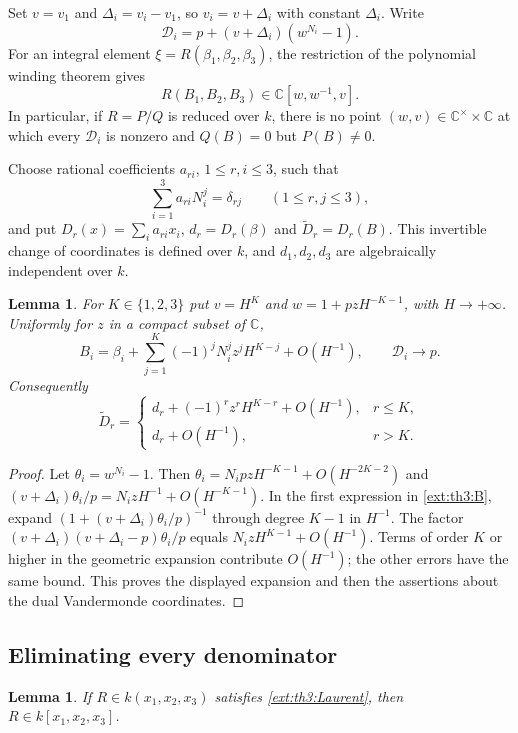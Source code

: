 \documentclass[11pt,a4paper]{article}
\newtheorem{lemma}[theorem]{Lemma}
\theoremstyle{definition}\newtheorem{definition}[theorem]{Definition}
\theoremstyle{remark}\newtheorem{remark}[theorem]{Remark}
\begin{document}
Set $v=v_1$ and $\Delta_i=v_i-v_1$, so $v_i=v+\Delta_i$ with constant
$\Delta_i$.  Write
\[
 \mathcal D_i=p+(v+\Delta_i)(w^{N_i}-1).
\]
For an integral element $\xi=R(\beta_1,\beta_2,\beta_3)$, the restriction
of the polynomial winding theorem gives
\begin{equation}\label{ext:th3:Laurent}
 R(B_1,B_2,B_3)\in\mathbb C[w,w^{-1},v].
\end{equation}
In particular, if $R=P/Q$ is reduced over $k$, there is no point
$(w,v)\in\mathbb C^\times\times\mathbb C$ at which every $\mathcal D_i$
is nonzero and $Q(B)=0$ but $P(B)\ne0$.

Choose rational coefficients $a_{ri}$, $1\le r,i\le3$, such that
\[
 \sum_{i=1}^3 a_{ri}N_i^j=\delta_{rj}\qquad(1\le r,j\le3),
\]
and put $D_r(x)=\sum_i a_{ri}x_i$, $d_r=D_r(\beta)$ and
$\widetilde D_r=D_r(B)$.  This invertible change of coordinates is defined
over $k$, and $d_1,d_2,d_3$ are algebraically independent over $k$.

\begin{lemma}\label{ext:th3:charts}
For $K\in\{1,2,3\}$ put $v=H^K$ and
$w=1+pzH^{-K-1}$, with $H\to+\infty$.  Uniformly for $z$ in a compact
subset of $\mathbb C$,
\[
 B_i=\beta_i+\sum_{j=1}^K(-1)^jN_i^jz^jH^{K-j}+O(H^{-1}),
 \qquad \mathcal D_i\longrightarrow p.
\]
Consequently
\[
 \widetilde D_r=
 \begin{cases}
 d_r+(-1)^rz^rH^{K-r}+O(H^{-1}),&r\le K,\\
 d_r+O(H^{-1}),&r>K.
 \end{cases}
\]
\end{lemma}

\begin{proof}
Let $\theta_i=w^{N_i}-1$.  Then
$\theta_i=N_ipzH^{-K-1}+O(H^{-2K-2})$ and
$(v+\Delta_i)\theta_i/p=N_izH^{-1}+O(H^{-K-1})$.
In the first expression in \eqref{ext:th3:B}, expand
$(1+(v+\Delta_i)\theta_i/p)^{-1}$ through degree $K-1$ in $H^{-1}$.
The factor $(v+\Delta_i)(v+\Delta_i-p)\theta_i/p$ equals
$N_izH^{K-1}+O(H^{-1})$.  Terms of order $K$ or higher in the geometric
expansion contribute $O(H^{-1})$; the other errors have the same bound.
This proves the displayed expansion and then the assertions about the
dual Vandermonde coordinates.
\end{proof}

\subsection{Eliminating every denominator}
\begin{lemma}\label{ext:th3:denominator}
If $R\in k(x_1,x_2,x_3)$ satisfies \eqref{ext:th3:Laurent}, then
$R\in k[x_1,x_2,x_3]$.
\end{lemma}
\end{document}
